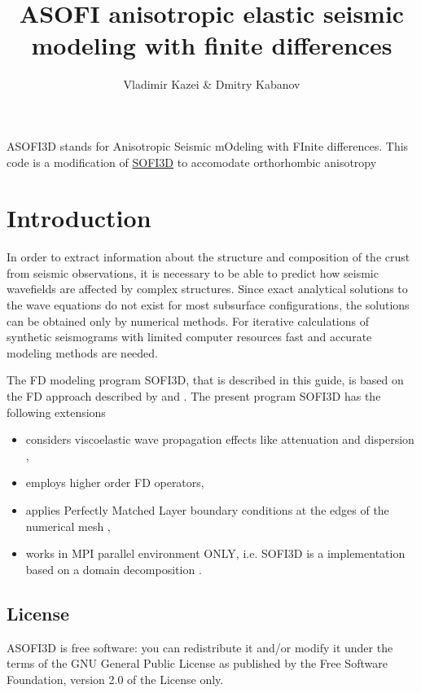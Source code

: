 \documentclass{hitec}
\title{ASOFI anisotropic elastic seismic modeling with finite differences}
\author{Vladimir Kazei \& Dmitry Kabanov}
\begin{document}
	
\maketitle
ASOFI3D stands for Anisotropic Seismic mOdeling with FInite differences.
This code is a modification of
\href{https://git.scc.kit.edu/GPIAG-Software/SOFI3D/wikis/home}{SOFI3D}
to accomodate orthorhombic anisotropy

\tableofcontents

\section{Introduction}\label{intro}
In order to extract information about the structure and composition of the crust from seismic observations, it is necessary to be able to predict how seismic wavefields are affected by complex structures.
Since exact analytical solutions to the wave equations do not exist for most subsurface configurations, the solutions can be obtained only by numerical methods. For iterative calculations of synthetic seismograms with limited computer resources fast and accurate modeling methods are needed. 

The FD modeling program SOFI3D, that is described in this guide, is based on the FD approach described by \cite{virieux:86} and \cite{levander:88}. The present program SOFI3D has the following extensions

\begin{itemize}
	\item considers viscoelastic wave propagation effects like attenuation and dispersion \\
	\cite{robertsson:94,blanch:95,bohlen:02},
	\item employs higher order FD operators,
	\item applies Perfectly Matched Layer boundary conditions at the edges of the numerical mesh \cite{komatitsch:07},
	\item works in MPI parallel environment ONLY, i.e. SOFI3D is a implementation based on a domain decomposition
	\cite{bohlen:02}.
\end{itemize}

\subsection{License}\label{license}

ASOFI3D is free software: you can redistribute it and/or modify it under the terms of the GNU General Public License as published by the Free Software Foundation, version 2.0 of the License only.
\end{document}
